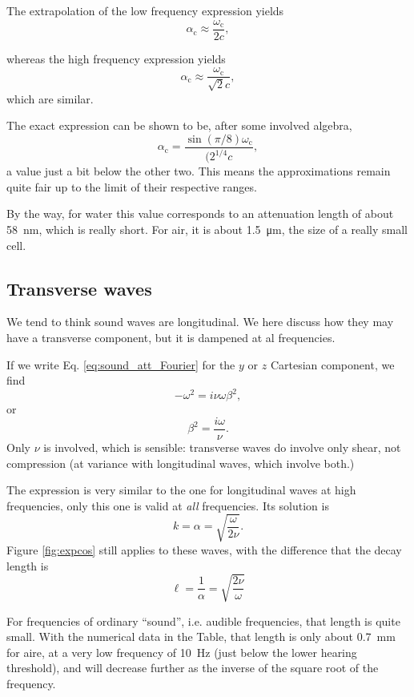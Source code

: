The extrapolation of the low frequency expression yields
\[
\alpha_\mathrm{c}\approx \frac{\omega_\mathrm{c}}{2 c} ,
\]

whereas the high frequency expression yields
\[
\alpha_\mathrm{c}\approx \frac{\omega_\mathrm{c}}{\sqrt{2} c} ,
\]
which are similar.

The exact expression can be shown to be, after some involved algebra,
\[
\alpha_\mathrm{c} =\frac{ \sin(\pi/8) \omega_\mathrm{c} }{ (2^{1/4} c } ,
\]
a value just a bit below the other two. This means the approximations
remain quite fair up to the limit of their respective ranges.

By the way, for water this value corresponds to an attenuation length
of about \SI{58}{\nano\meter}, which is really short. For air, it is
about \SI{1.5}{\micro\meter}, the size of a really small cell.


\subsection{Transverse waves}

We tend to think sound waves are longitudinal. We here discuss how
they may have a transverse component, but it is dampened at al
frequencies.

If we write Eq. \ref{eq:sound_att_Fourier} for the $y$ or $z$
Cartesian component, we find
\[
-\omega^2 =  i \nu \omega \beta^2 ,
\]
or
\[
\beta^2 = \frac{i \omega}{\nu}.
\]
Only $\nu$ is involved, which is sensible: transverse waves do involve
only shear, not compression (at variance with longitudinal waves,
which involve both.)

The expression is very similar to the one for longitudinal waves at
high frequencies, only this one is valid at \emph{all} frequencies.
Its solution is
\[
k = \alpha = \sqrt{ \frac{\omega}{ 2 \nu}}.
\]
Figure \ref{fig:expcos} still applies to these waves, with the
difference that the decay length is
\[
\ell= \frac{1}{\alpha}=\sqrt{\frac{ 2 \nu}{\omega}}
\]

For frequencies of ordinary ``sound'', i.e. audible frequencies, that
length is quite small. With the numerical data in the Table, that
length is only about \SI{0.7}{\milli\meter} for aire, at a very low
frequency of \SI{10}{\hertz} (just below the lower hearing threshold),
and will decrease further as the inverse of the square root of the
frequency.



